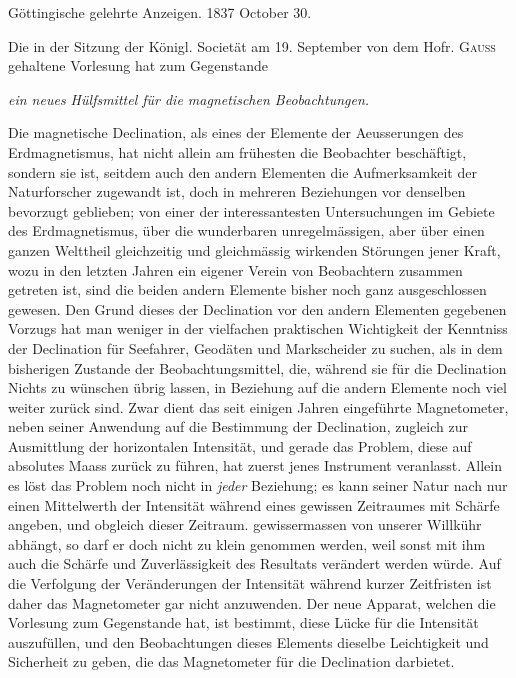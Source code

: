 \clearpage
{}
\begin{center}
Göttingische gelehrte Anzeigen. 1837 October 30.
\end{center}

Die in der Sitzung der Königl. Societät am 19. September von dem Hofr. \textsc{Gauss} gehaltene Vorlesung hat zum Gegenstande
\begin{center}
\textit{ein neues Hülfsmittel für die magnetischen Beobachtungen.}
\end{center}

Die magnetische Declination, als eines der Elemente der Aeusserungen des Erdmagnetismus, hat nicht allein am frühesten die Beobachter beschäftigt, sondern sie ist, seitdem auch den andern Elementen die Aufmerksamkeit der Naturforscher zugewandt ist, doch in mehreren Beziehungen vor denselben bevorzugt geblieben; von einer der interessantesten Untersuchungen im Gebiete des Erdmagnetismus, über die wunderbaren unregelmässigen, aber über einen ganzen Welttheil gleichzeitig und gleichmässig wirkenden Störungen jener Kraft, wozu in den letzten Jahren ein eigener Verein von Beobachtern zusammen getreten ist, sind die beiden andern Elemente bisher noch ganz ausgeschlossen gewesen. Den Grund dieses der Declination vor den andern Elementen gegebenen Vorzugs hat man weniger in der vielfachen praktischen Wichtigkeit der Kenntniss der Declination für Seefahrer, Geodäten und Markscheider zu suchen, als in dem bisherigen Zustande der Beobachtungsmittel, die, während sie für die Declination Nichts zu wünschen übrig lassen, in Beziehung auf die andern Elemente noch viel weiter zurück sind. Zwar dient das seit einigen Jahren eingeführte Magnetometer, neben seiner Anwendung auf die Bestimmung der Declination, zugleich zur Ausmittlung der horizontalen Intensität, und gerade das Problem, diese auf absolutes Maass zurück zu führen, hat zuerst jenes Instrument veranlasst. Allein es löst das Problem noch nicht in \textit{jeder} Beziehung; es kann seiner Natur nach nur einen Mittelwerth der Intensität während eines gewissen Zeitraumes mit Schärfe angeben, und obgleich dieser Zeitraum. gewissermassen von unserer Willkühr abhängt, so darf er doch nicht zu klein genommen werden, weil sonst mit ihm auch die Schärfe und Zuverlässigkeit des Resultats verändert werden würde. Auf die Verfolgung der Veränderungen der Intensität während kurzer Zeitfristen ist daher das Magnetometer gar nicht anzuwenden. Der neue Apparat, welchen die Vorlesung zum Gegenstande hat, ist bestimmt, diese Lücke für die Intensität auszufüllen, und den Beobachtungen dieses Elements dieselbe Leichtigkeit und Sicherheit zu geben, die das Magnetometer für die Declination darbietet.

